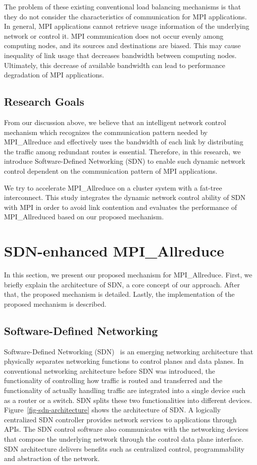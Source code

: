 The problem of these existing conventional load balancing mechanisms is
that they do not consider the characteristics of communication for MPI
applications. In general, MPI applications cannot retrieve usage
information of the underlying network or control it. MPI communication
does not occur evenly among computing nodes, and its sources and
destinations are biased. This may cause inequality of link usage that
decreases bandwidth between computing nodes. Ultimately, this decrease
of available bandwidth can lead to performance degradation of MPI
applications.

\subsection{Research Goals}

From our discussion above, we believe that an intelligent network control
mechanism which recognizes the communication pattern needed by MPI\_Allreduce
and effectively uses the bandwidth of each link by distributing the traffic
among redundant routes is essential. Therefore, in this research, we introduce
Software-Defined Networking (SDN) to enable such dynamic network control
dependent on the communication pattern of MPI applications.

We try to accelerate MPI\_Allreduce on a cluster system with a fat-tree
interconnect. This study integrates the dynamic network control ability of SDN
with MPI in order to avoid link contention and evaluates the performance of
MPI\_Allreduced based on our proposed mechanism.

\section{SDN-enhanced MPI\_Allreduce}\label{iii-proposal}

In this section, we present our proposed mechanism for
MPI\_Allreduce. First, we briefly explain the architecture of
SDN, a core concept of our approach. After that, the proposed mechanism
is detailed. Lastly, the implementation of the proposed mechanism is
described.

\subsection{Software-Defined Networking}

Software-Defined Networking (SDN)~\autocite{sdn} is an emerging networking
architecture that physically separates networking functions to control
planes and data planes. In conventional networking architecture before
SDN was introduced, the functionality of controlling how traffic is
routed and transferred and the functionality of actually handling
traffic are integrated into a single device such as a router or a
switch. SDN splits these two functionalities into different devices.
Figure~\ref{fig-sdn-architecture} shows the architecture of SDN\@. A
logically centralized SDN controller provides network services to
applications through APIs. The SDN control software also communicates
with the networking devices that compose the underlying network through
the control data plane interface. SDN architecture delivers benefits
such as centralized control, programmability and abstraction of the
network.


